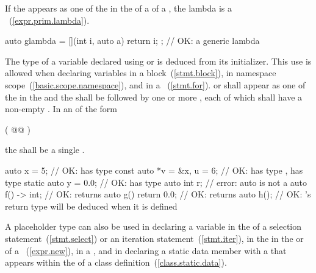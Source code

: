 \pnum
If the   appears as one of the
 in the  of a
 of a , the
%
lambda is a ~(\ref{expr.prim.lambda}). \enterexample
\begin{codeblock}
auto glambda = [](int i, auto a) { return i; }; // OK: a generic lambda
\end{codeblock}
\exitexample

\pnum
The type of a variable declared using  or  is
deduced from its initializer. This use is allowed when declaring variables in a
block~(\ref{stmt.block}), in
namespace scope~(\ref{basic.scope.namespace}), and in a
~(\ref{stmt.for}).
 or  shall appear as one of the
 in the
 and the
shall be followed by one or more , each of which shall
have a non-empty . In an
 of the form

\begin{codeblock}
( @@ )
\end{codeblock}

the  shall be a single
.

\enterexample
\begin{codeblock}
auto x = 5;                 // OK:  has type 
const auto *v = &x, u = 6;  // OK:  has type ,  has type 
static auto y = 0.0;        // OK:  has type 
auto int r;                 // error: auto is not a 
auto f() -> int;            // OK:  returns 
auto g() { return 0.0; }    // OK:  returns 
auto h();                   // OK: 's return type will be deduced when it is defined
\end{codeblock}
\exitexample

\pnum
A placeholder type can also be used in declaring a variable in
the  of a selection statement~(\ref{stmt.select}) or an iteration
statement~(\ref{stmt.iter}), in the  in 
the  or  of a
~(\ref{expr.new}), in a
, and in declaring a static data member with a
 that appears within the
 of a class definition~(\ref{class.static.data}).

